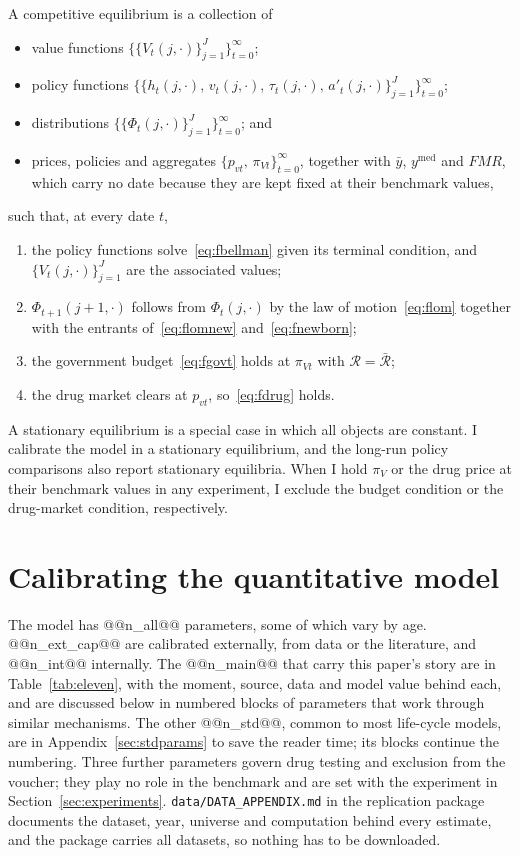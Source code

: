 \documentclass[10pt]{article}
\begin{document}
A competitive equilibrium is a collection of
\begin{itemize}\setlength{\itemsep}{0em}\setlength{\parskip}{0em}
\item value functions $\big\{\{V_t(j,\cdot)\}_{j=1}^{J}\big\}_{t=0}^{\infty}$;
\item policy functions
$\big\{\{h_t(j,\cdot),\,v_t(j,\cdot),\,\tau_t(j,\cdot),\,a'_t(j,\cdot)\}_{j=1}^{J}\big\}_{t=0}^{\infty}$;
\item distributions $\big\{\{\Phi_t(j,\cdot)\}_{j=1}^{J}\big\}_{t=0}^{\infty}$; and
\item prices, policies and aggregates
$\big\{p_{vt},\,\pi_{Vt}\big\}_{t=0}^{\infty}$, together with $\bar y$, $y^{\text{med}}$ and
$\mathit{FMR}$, which carry no date because they are kept fixed at their benchmark values,
\end{itemize}
such that, at every date $t$,
\begin{enumerate}\setlength{\itemsep}{0.1em}\setlength{\parskip}{0em}
\item the policy functions solve~\eqref{eq:fbellman} given its terminal condition, and
$\{V_t(j,\cdot)\}_{j=1}^{J}$ are the associated values;
\item $\Phi_{t+1}(j{+}1,\cdot)$ follows from $\Phi_t(j,\cdot)$ by the law of
motion~\eqref{eq:flom} together with the entrants of~\eqref{eq:flomnew}
and~\eqref{eq:fnewborn};
\item the government budget~\eqref{eq:fgovt} holds at
$\pi_{Vt}$ with $\mathcal R=\bar{\mathcal R}$;
\item the drug market clears at $p_{vt}$, so~\eqref{eq:fdrug} holds.
\end{enumerate}
  A stationary equilibrium is a special case in which all objects are constant. I calibrate the model in a stationary equilibrium, and the long-run policy comparisons also report stationary equilibria. When I hold $\pi_V$ or the drug price at their benchmark values in any experiment, I exclude the budget condition or the drug-market condition, respectively.

\section{Calibrating the quantitative model}\label{sec:fullcal}

The model has @@n_all@@ parameters, some of which vary by age. @@n_ext_cap@@ are calibrated externally, from data or the literature, and @@n_int@@ internally. The @@n_main@@ that carry this paper's story are in Table~\ref{tab:eleven}, with the moment, source, data and model value behind each, and are discussed below in numbered blocks of parameters that work through similar mechanisms. The other @@n_std@@, common to most life-cycle models, are in Appendix~\ref{sec:stdparams} to save the reader time; its blocks continue the numbering. Three further parameters govern drug testing and exclusion from the voucher; they play no role in the benchmark and are set with the experiment in Section~\ref{sec:experiments}. \texttt{data/DATA\_APPENDIX.md} in the replication package documents the dataset, year, universe and computation behind every estimate, and the package carries all datasets, so nothing has to be downloaded.
\end{document}
